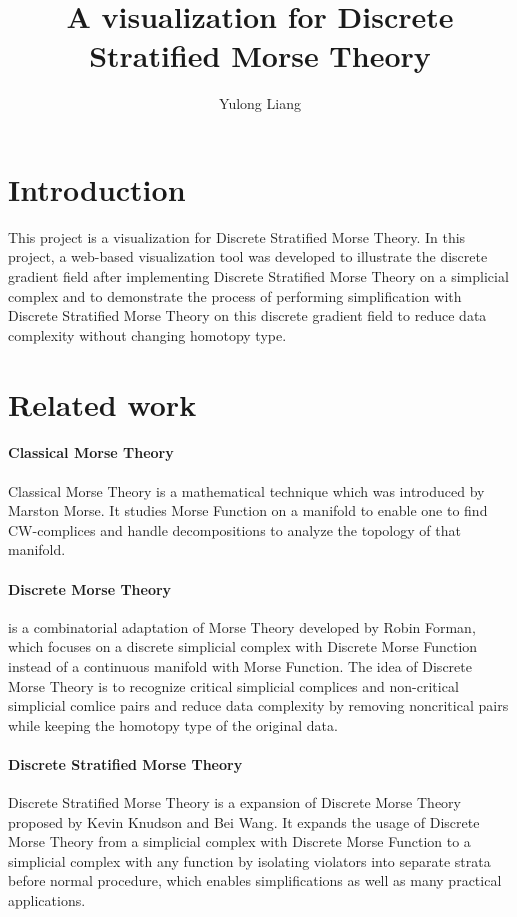 \documentclass[12pt]{article}
\begin{document}
\title{A visualization for Discrete Stratified Morse Theory}
\author{Yulong Liang}
\maketitle

\section{Introduction}

This project is a visualization for Discrete Stratified Morse Theory. In this project, a web-based visualization tool was developed to illustrate the discrete gradient field after implementing Discrete Stratified Morse Theory on a simplicial complex and to demonstrate the process of performing simplification with Discrete Stratified Morse Theory on this discrete gradient field to reduce data complexity without changing homotopy type.

\section{Related work}
\paragraph{Classical Morse Theory} Classical Morse Theory is a mathematical technique which was introduced by Marston Morse. It studies Morse Function on a manifold to enable one to find CW-complices and handle decompositions to analyze the topology of that manifold.

\paragraph{Discrete Morse Theory} is a combinatorial adaptation of Morse Theory developed by Robin Forman, which focuses on a discrete simplicial complex with Discrete Morse Function instead of a continuous manifold with Morse Function. The idea of Discrete Morse Theory is to recognize critical simplicial complices and non-critical simplicial comlice pairs and reduce data complexity by removing noncritical pairs while keeping the homotopy type of the original data.

\paragraph{Discrete Stratified Morse Theory} Discrete Stratified Morse Theory is a expansion of Discrete Morse Theory proposed by Kevin Knudson and Bei Wang. It expands the usage of Discrete Morse Theory from a simplicial complex with Discrete Morse Function to a simplicial complex with any function by isolating violators into separate strata before normal procedure, which enables simplifications as well as many practical applications.
\end{document}
